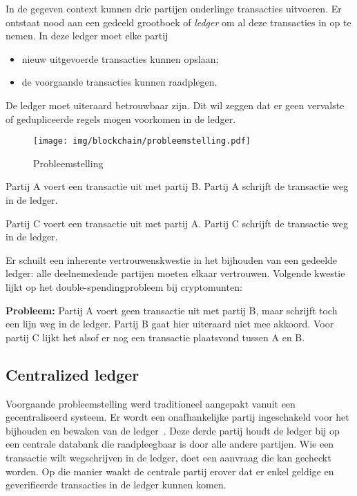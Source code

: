 In de gegeven context kunnen drie partijen onderlinge transacties uitvoeren. Er ontstaat nood aan een gedeeld grootboek of \textit{ledger} om al deze transacties in op te nemen. In deze ledger moet elke partij
\begin{itemize}
	\item nieuw uitgevoerde transacties kunnen opslaan;
	\item de voorgaande transacties kunnen raadplegen.
\end{itemize}

De ledger moet uiteraard betrouwbaar zijn. Dit wil zeggen dat er geen vervalste of gedupliceerde regels mogen voorkomen in de ledger.

\begin{figure}[H]
	\centering
	\texttt{[image: img/blockchain/probleemstelling.pdf]}
	\caption{\label{fig:probleemstelling}Probleemstelling}
\end{figure}

\begin{tcolorbox}[title=Voorbeeld]	
Partij A voert een transactie uit met partij B. Partij A schrijft de transactie weg in de ledger.

Partij C voert een transactie uit met partij A. Partij C schrijft de transactie weg in de ledger.
\end{tcolorbox}

Er schuilt een inherente vertrouwenskwestie in het bijhouden van een gedeelde ledger: alle deelnemedende partijen moeten elkaar vertrouwen. Volgende kwestie lijkt op het double-spendingprobleem bij cryptomunten:

\textbf{Probleem:} 
Partij A voert geen transactie uit met partij B, maar schrijft toch een lijn weg in de ledger. Partij B gaat hier uiteraard niet mee akkoord. Voor partij C lijkt het alsof er nog een transactie plaatsvond tussen A en B.


\subsection{Centralized ledger}
\label{sub:centralized-ledger}

Voorgaande probleemstelling werd traditioneel aangepakt vanuit een gecentraliseerd systeem. Er wordt een onafhankelijke partij ingeschakeld voor het bijhouden en bewaken van de ledger~\autocite{Rawat2020}. Deze derde partij houdt de ledger bij op een centrale databank die raadpleegbaar is door alle andere partijen. Wie een transactie wilt wegschrijven in de ledger, doet een aanvraag die kan gecheckt worden. Op die manier waakt de centrale partij erover dat er enkel geldige en geverifieerde transacties in de ledger kunnen komen. 

